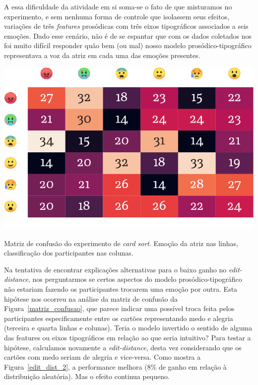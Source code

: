 \documentclass{tufte-handout}
\begin{document}
A essa dificuldade da atividade em si soma-se o fato de que misturamos no experimento, e sem nenhuma forma de controle que isolassem seus efeitos, variações de três \textit{features} prosódicas com três eixos tipográficos associados a seis emoções. Dado esse cenário, não é de se espantar que com os dados coletados nos foi muito difícil responder quão bem (ou mal) nosso modelo prosódico-tipográfico representava a voz da atriz em cada uma das emoções presentes. 


\begin{marginfigure}
  \includegraphics{imgs/confusion-emoji2.png}
  \caption{Matriz de confusão do experimento de \textit{card sort}. Emoção da atriz nas linhas, classificação dos participantes nas colunas.}
  \label{matriz_confusao}
\end{marginfigure}

Na tentativa de encontrar explicações alternativas para o baixo ganho no \textit{edit-distance}, nos perguntarmos se certos aspectos do modelo prosódico-tipográfico não estariam fazendo os participantes trocarem uma emoção por outra. Esta hipótese nos ocorreu na análise da matriz de confusão da Figura~\ref{matriz_confusao}, que parece indicar uma possível troca feita pelos participantes especificamente entre os cartões representando medo e alegria (terceira e quarta linhas e colunas). Teria o modelo invertido o sentido de alguma das features ou eixos tipográficos em relação ao que seria intuitivo? Para testar a hipótese, calculamos novamente a \textit{edit-distance}, desta vez considerando que os cartões com medo seriam de alegria e vice-versa. Como mostra a Figura~\ref{edit_dist_2}, a performance melhora (8\% de ganho em relação à distribuição aleatória). Mas o efeito continua pequeno.
\end{document}
